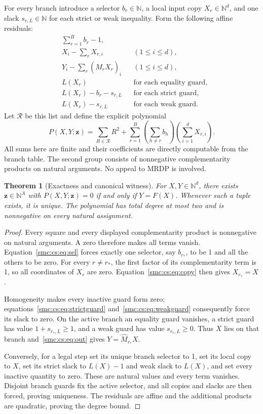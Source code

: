 \documentclass[11pt,letterpaper]{article}
\numberwithin{equation}{section}
\newtheorem{theorem}{Theorem}[section]
\theoremstyle{definition}
\theoremstyle{remark}
\newcommand{\NN}{\mathbb N}
\begin{document}
For every branch introduce a selector $b_r\in\NN$, a local input copy $X_r\in\NN^d$, and one slack $s_{r,L}\in\NN$ for each strict or weak inequality. Form the following affine residuals:
\begin{align}
 &\sum_{r=1}^{B} b_r-1,\label{smc:cs:eq:sel}\\
 &X_i-\sum_r X_{r,i} &&(1\le i\le d),\label{smc:cs:eq:copy}\\
 &Y_i-\sum_r(\widehat M_r X_r)_i &&(1\le i\le d),\label{smc:cs:eq:out}\\
 &L(X_r) &&\text{for each equality guard},\label{smc:cs:eq:eqguard}\\
 &L(X_r)-b_r-s_{r,L} &&\text{for each strict guard},\label{smc:cs:eq:strictguard}\\
 &L(X_r)-s_{r,L} &&\text{for each weak guard}.\label{smc:cs:eq:weakguard}
\end{align}
Let $\mathcal R$ be this list and define the explicit polynomial
\begin{equation}\label{smc:cs:eq:polynomial}
 P(X,Y;\mathbf z)
 =\sum_{R\in\mathcal R}R^2
  +\sum_{r=1}^{B}
      \left(\sum_{h\ne r}b_h\right)
      \left(\sum_{i=1}^{d}X_{r,i}\right).
\end{equation}
All sums here are finite and their coefficients are directly computable from the branch table. The second group consists of nonnegative complementarity products on natural arguments. No appeal to MRDP is involved.

\begin{theorem}[Exactness and canonical witness]\label{smc:cs:thm:packet}
For $X,Y\in\NN^d$, there exists $\mathbf z\in\NN^A$ with $P(X,Y;\mathbf z)=0$ if and only if $Y=F(X)$. Whenever such a tuple exists, it is unique. The polynomial has total degree at most two and is nonnegative on every natural assignment.
\end{theorem}
\begin{proof}
Every square and every displayed complementarity product is nonnegative on natural arguments. A zero therefore makes all terms vanish. Equation~\eqref{smc:cs:eq:sel} forces exactly one selector, say $b_{r_*}$, to be 1 and all the others to be zero. For every $r\ne r_*$, the first factor of its complementarity term is 1, so all coordinates of $X_r$ are zero. Equation~\eqref{smc:cs:eq:copy} then gives $X_{r_*}=X$.

Homogeneity makes every inactive guard form zero; equations~\eqref{smc:cs:eq:strictguard} and~\eqref{smc:cs:eq:weakguard} consequently force its slack to zero. On the active branch an equality guard vanishes, a strict guard has value $1+s_{r_*,L}\ge1$, and a weak guard has value $s_{r_*,L}\ge0$. Thus $X$ lies on that branch and~\eqref{smc:cs:eq:out} gives $Y=\widehat M_{r_*}X$.

Conversely, for a legal step set its unique branch selector to 1, set its local copy to $X$, set its strict slack to $L(X)-1$ and weak slack to $L(X)$, and set every inactive quantity to zero. These are natural values and every term vanishes. Disjoint branch guards fix the active selector, and all copies and slacks are then forced, proving uniqueness. The residuals are affine and the additional products are quadratic, proving the degree bound.
\end{proof}
\end{document}
